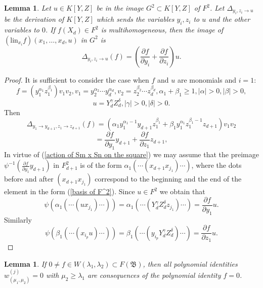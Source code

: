 \documentclass{amsart}[12pt]
\newtheorem{lemma}[theorem]{Lemma}
\theoremstyle{definition}
\begin{document}
\begin{lemma}\label{action of delta}
Let $u\in K[Y,Z]$ be in the image $G^2\subset K[Y,Z]$ of $F^2$.
Let $\Delta_{y_i,z_i\to u}$ be the derivation of $K[Y,Z]$ which sends the variables $y_i,z_i$ to $u$ and the other variables to $0$.
If $f(X_d)\in F^2$ is multihomogeneous, then the image of
$(\text{lin}_{x_i}f)(x_1,\ldots,x_d,u)$ in $G^2$ is
\[
\Delta_{y_i,z_i\to u}(f)=\left(\frac{\partial f}{\partial y_i}+\frac{\partial f}{\partial z_i}\right)u.
\]
\end{lemma}

\begin{proof}
It is sufficient to consider the case when $f$ and $u$ are monomials and $i=1$:
\[
f=(y_1^{\alpha_1}z_1^{\beta_1})v_1v_2, v_1=y_2^{\alpha_2}\cdots y_d^{\alpha_d},v_2=z_2^{\beta_2}\cdots z_d^{\beta_d},
\alpha_1+\beta_1\geq 1,\vert\alpha\vert>0,\vert\beta\vert>0,
\]
\[
u=Y_d^{\gamma}Z_d^{\delta},\vert\gamma\vert>0,\vert\delta\vert>0.
\]
Then
\[
\Delta_{y_1\to y_{d+1},z_1\to z_{d+1}}(f)=(\alpha_1y_1^{\alpha_1-1}y_{d+1}z_1^{\beta_1}+\beta_1y_1^{\alpha_1}z_1^{\beta_1-1}z_{d+1})v_1v_2
\]
\[
=\frac{\partial f}{\partial y_1}y_{d+1}+\frac{\partial f}{\partial z_1}z_{d+1},
\]
In virtue of (\ref{action of Sm x Sn on the square}) we may assume that the preimage
$\displaystyle \psi^{-1}\left(\frac{\partial f}{\partial y_1}y_{d+1}\right)$ in $F_{d+1}^2$ is of the form
$\alpha_1(\cdots(x_{d+1}x_{j_1})\cdots)$, where the dots before and after $(x_{d+1}x_{j_1})$ correspond to the beginning and the end of the element in the form
(\ref{basis of F^2}). Since $u\in F^2$ we obtain that
\[
\psi(\alpha_1(\cdots(ux_{j_1})\cdots))=\alpha_1(\cdots (Y_d^{\gamma}Z_d^{\delta}z_{j_1})\cdots)=\frac{\partial f}{\partial y_1}u.
\]
Similarly
\[
\psi(\beta_1(\cdots(x_{i_p}u)\cdots))=\beta_1(\cdots (y_{i_p}Y_d^{\gamma}Z_d^{\delta})\cdots)=\frac{\partial f}{\partial z_1}u.
\]
\end{proof}

\begin{lemma}\label{consequences of w(lambda)}
If $0\not=f\in W(\lambda_1,\lambda_2)\subset F({\mathfrak B})$, then all polynomial identities $w_{(\mu_1,\mu_2)}^{(j)}=0$ with $\mu_2\geq \lambda_1$
are consequences of the polynomial identity $f=0$.
\end{lemma}
\end{document}
